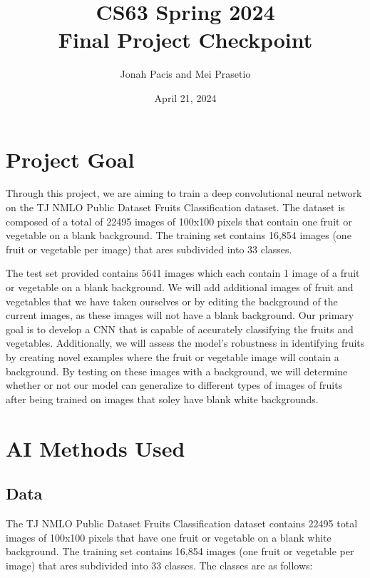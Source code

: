 \documentclass[11pt]{article}
\title{CS63 Spring 2024\\Final Project Checkpoint}
\author{Jonah Pacis and Mei Prasetio}
\date{April 21, 2024}
\begin{document}
\maketitle

\section{Project Goal}

Through this project, we are aiming to train a deep convolutional neural network on the TJ NMLO Public Dataset Fruits Classification dataset. The dataset is composed of a total of 22495 images of 100x100 pixels that contain one fruit or vegetable on a blank background. The training set contains 16,854 images (one fruit or vegetable per image) that ares subdivided into 33 classes. 

\noindent The test set provided contains 5641 images which each contain 1 image of a fruit or vegetable on a blank background. We will add additional images of fruit and vegetables that we have taken ourselves or by editing the background of the current images, as these images will not have a blank background.
Our primary goal is to develop a CNN that is capable of accurately classifying the fruits and vegetables. Additionally, we will assess the model's robustness in identifying fruits by creating novel examples where the fruit or vegetable image will contain a background. By testing on these images with a background, we will determine whether or not our model can generalize to different types of images of fruits after being trained on images that soley have blank white backgrounds.

\section{AI Methods Used}

\subsection{Data}
 The TJ NMLO Public Dataset Fruits Classification dataset contains 22495 total images of 100x100 pixels that have one fruit or vegetable on a blank white background. The training set contains 16,854 images (one fruit or vegetable per image) that ares subdivided into 33 classes.
The classes are as follows:
\end{document}
